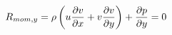 \documentclass[preview]{standalone}
\begin{document}
\begin{align*}
\special{dvisvgm:raw <g id='unique000'>}R_{mom,y} = \rho \left( u \frac{\partial v}{\partial x} + v \frac{\partial v}{\partial y} \right) + \frac{\partial p}{\partial y} = 0\special{dvisvgm:raw </g>}
\end{align*}
\end{document}
